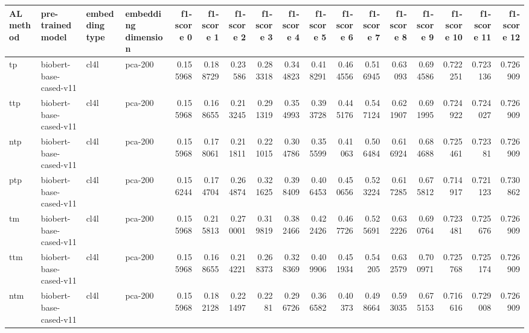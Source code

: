 \begin{tabular}{llllrrrrrrrrrrrrr}
\hline
 AL method   & pre-trained model      & embedding type   & embedding dimension   &   f1-score 0 &   f1-score 1 &   f1-score 2 &   f1-score 3 &   f1-score 4 &   f1-score 5 &   f1-score 6 &   f1-score 7 &   f1-score 8 &   f1-score 9 &   f1-score 10 &   f1-score 11 &   f1-score 12 \\
\hline
 tp          & biobert-base-cased-v11 & cl4l             & pca-200               &     0.155968 &     0.188729 &     0.23586  &     0.283318 &     0.344823 &     0.418291 &     0.464556 &     0.516945 &     0.63093  &     0.694586 &      0.722251 &      0.723136 &      0.726909 \\
 ttp         & biobert-base-cased-v11 & cl4l             & pca-200               &     0.155968 &     0.168655 &     0.213245 &     0.291319 &     0.354993 &     0.393728 &     0.445176 &     0.547124 &     0.621907 &     0.691995 &      0.724922 &      0.724027 &      0.726909 \\
 ntp         & biobert-base-cased-v11 & cl4l             & pca-200               &     0.155968 &     0.178061 &     0.211811 &     0.221015 &     0.304786 &     0.355599 &     0.41063  &     0.506484 &     0.616924 &     0.684688 &      0.725461 &      0.72381  &      0.726909 \\
 ptp         & biobert-base-cased-v11 & cl4l             & pca-200               &     0.156244 &     0.174704 &     0.264874 &     0.321625 &     0.398409 &     0.406453 &     0.450656 &     0.523224 &     0.617285 &     0.675812 &      0.714917 &      0.721123 &      0.730862 \\
 tm          & biobert-base-cased-v11 & cl4l             & pca-200               &     0.155968 &     0.215813 &     0.270001 &     0.319819 &     0.382466 &     0.422426 &     0.467726 &     0.525691 &     0.632226 &     0.690764 &      0.723481 &      0.725676 &      0.726909 \\
 ttm         & biobert-base-cased-v11 & cl4l             & pca-200               &     0.155968 &     0.168655 &     0.214221 &     0.268373 &     0.328369 &     0.409906 &     0.451934 &     0.54205  &     0.632579 &     0.700971 &      0.725768 &      0.725174 &      0.726909 \\
 ntm         & biobert-base-cased-v11 & cl4l             & pca-200               &     0.155968 &     0.182128 &     0.221497 &     0.2281   &     0.296726 &     0.366582 &     0.40373  &     0.498664 &     0.593035 &     0.675153 &      0.716616 &      0.729008 &      0.726909 \\

\end{tabular}
